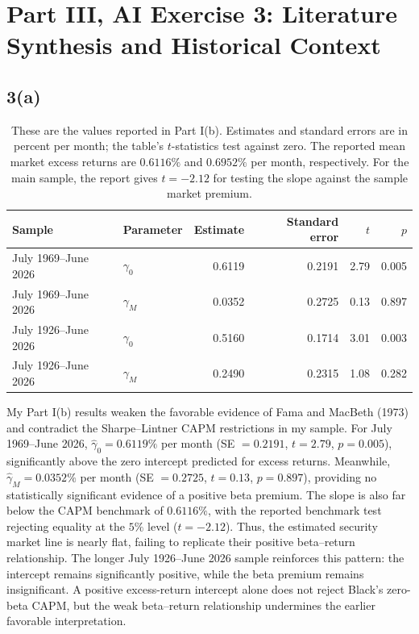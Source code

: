 \section{Part III, AI Exercise 3: Literature Synthesis and Historical Context}

\subsection{3(a)}

\begin{table}[H]
\centering
\caption{These are the values reported in Part I(b). Estimates and standard
errors are in percent per month; the table's $t$-statistics test against zero.
The reported mean market excess returns are $0.6116\%$ and $0.6952\%$ per
month, respectively. For the main sample, the report gives $t = -2.12$ for
testing the slope against the sample market premium.}
\small
\begin{tabular}{llrrrr}
\toprule
Sample & Parameter & Estimate & Standard error & $t$ & $p$ \\
\midrule
July 1969--June 2026 & $\gamma_0$ & 0.6119 & 0.2191 & 2.79 & 0.005 \\
July 1969--June 2026 & $\gamma_M$ & 0.0352 & 0.2725 & 0.13 & 0.897 \\
July 1926--June 2026 & $\gamma_0$ & 0.5160 & 0.1714 & 3.01 & 0.003 \\
July 1926--June 2026 & $\gamma_M$ & 0.2490 & 0.2315 & 1.08 & 0.282 \\
\bottomrule
\end{tabular}
\label{tab:ex3a}
\end{table}

My Part I(b) results weaken the favorable evidence of Fama and MacBeth (1973)
and contradict the Sharpe--Lintner CAPM restrictions in my sample. For July
1969--June 2026, $\hat\gamma_0 = 0.6119\%$ per month (SE $= 0.2191$,
$t = 2.79$, $p = 0.005$), significantly above the zero intercept predicted for
excess returns. Meanwhile, $\hat\gamma_M = 0.0352\%$ per month
(SE $= 0.2725$, $t = 0.13$, $p = 0.897$), providing no statistically
significant evidence of a positive beta premium. The slope is also far below
the CAPM benchmark of $0.6116\%$, with the reported benchmark test rejecting
equality at the $5\%$ level ($t = -2.12$). Thus, the estimated security market
line is nearly flat, failing to replicate their positive beta--return
relationship. The longer July 1926--June 2026 sample reinforces this pattern:
the intercept remains significantly positive, while the beta premium remains
insignificant. A positive excess-return intercept alone does not reject
Black's zero-beta CAPM, but the weak beta--return relationship undermines the
earlier favorable interpretation.

